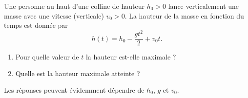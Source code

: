 
\begin{exercice}\label{exoOutilsMath-0040}

    Une personne au haut d'une colline de hauteur $h_0>0$ lance verticalement une masse avec une vitesse (verticale) $v_0>0$. La hauteur de la masse en fonction du temps est donnée par
    \[ 
        h(t)=h_0-\frac{ gt^2 }{2}+v_0t.
    \]
    \begin{enumerate}
        \item
            Pour quelle valeur de $t$ la hauteur est-elle maximale ?
        \item
            Quelle est la hauteur maximale atteinte ?
    \end{enumerate}
    Les réponses peuvent évidemment dépendre de $h_0$, $g$ et $v_0$.

\end{exercice}
